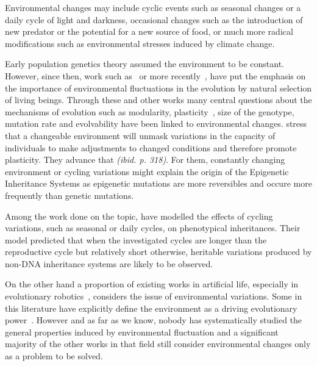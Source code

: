 Environmental changes may include cyclic events such as seasonal changes or a daily cycle of light and darkness, occasional changes such as the introduction of new predator or the potential for a new source of food, or much more radical modifications such as environmental stresses induced by climate change.

Early population genetics theory assumed the environment to be constant. However, since then, work such as~\citep{levins1968evolution} or more recently~\citep{jablonka2014evolution}, have put the emphasis on the importance of environmental fluctuations in the evolution by natural selection of living beings. Through these and other works many central questions about the mechanisms of evolution such as modularity, plasticity~\citep{west2005developmental}, size of the genotype, mutation rate and evolvability have been linked to environmental changes. \cite{jablonka2014evolution} stress that a changeable environment will unmask variations in the capacity of individuals to make adjustments to changed conditions and therefore promote plasticity. They advance that \emph{(ibid. p. 318)}. For them, constantly changing environment or cycling variations might explain the origin of the Epigenetic Inheritance Systems  as epigenetic mutations are more reversibles and occure more frequently than genetic mutations. 

Among the work done on the topic, \cite{lachmann1996inheritance} have modelled the effects of cycling variations, such as seasonal or daily cycles, on phenotypical inheritances. Their model predicted that when the investigated cycles are longer than the reproductive cycle but relatively short otherwise, heritable variations produced by non-DNA inheritance systems are likely to be observed. 

On the other hand a proportion of existing works in artificial life, especially in evolutionary robotics~\citep{floreano2000evolutionary}, considers the issue of environmental variations. Some in this literature have explicitly define the environment as a driving evolutionary power~\citep{bredeche2012environmentdrivenopenende}. However and as far as we know, nobody has systematically studied the general properties induced by environmental fluctuation and a significant majority of the other works in that field still consider environmental changes only as a problem to be solved.   %

